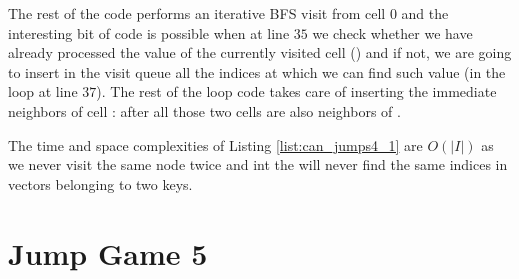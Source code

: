 The rest of the code performs an iterative BFS visit from cell $0$ and the interesting bit of code is possible when at line $35$ we check whether we have already processed the value of the currently visited cell () and if not, we are going to insert in the visit queue all the indices at which we can find such value (in the loop at line $37$).
The rest of the loop code takes care of inserting the immediate neighbors of cell : after all those two cells are also neighbors of .

The time and space complexities of Listing \ref{list:can_jumps4_1} are $O(|I|)$ as we never visit the same node twice and int the  will never find the same indices in vectors belonging to two keys.


\section{Jump Game 5}
\label{can_jump5:sec:statement}

